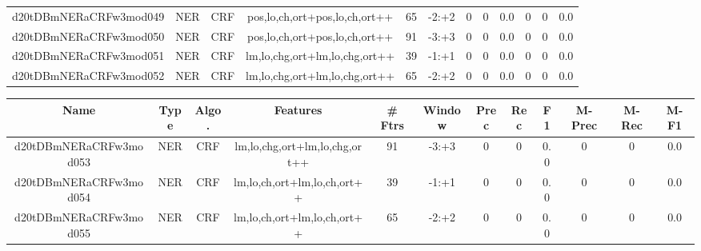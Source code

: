 \documentclass[a4paper]{article}
\begin{document}
\begin{landscape}
\begin{center}
\begin{tabular}{ |c|c|c|c|c|c|c|c|c|c|c|c|}
 	\small{ d20tDBmNERaCRFw3mod049 } & \small{ NER} & \small{  CRF }  & pos,lo,ch,ort+pos,lo,ch,ort++  &  65 &  \small{  -2:+2 }  &  0 & 0 & 0.0  &  0 & 0 & 0.0 \\
 	

 
 	
 	\small{ d20tDBmNERaCRFw3mod050 } & \small{ NER} & \small{  CRF }  & pos,lo,ch,ort+pos,lo,ch,ort++  &  91 &  \small{  -3:+3 }  &  0 & 0 & 0.0  &  0 & 0 & 0.0 \\
 	

 
 	
 	\small{ d20tDBmNERaCRFw3mod051 } & \small{ NER} & \small{  CRF }  & lm,lo,chg,ort+lm,lo,chg,ort++  &  39 &  \small{  -1:+1 }  &  0 & 0 & 0.0  &  0 & 0 & 0.0 \\
 	

 
 	
 	\small{ d20tDBmNERaCRFw3mod052 } & \small{ NER} & \small{  CRF }  & lm,lo,chg,ort+lm,lo,chg,ort++  &  65 &  \small{  -2:+2 }  &  0 & 0 & 0.0  &  0 & 0 & 0.0 \\
 	
 \hline
\end{tabular}
\end{center}




\begin{center}
\begin{tabular}{ |c|c|c|c|c|c|c|c|c|c|c|c|} 
 \hline
 	Name & Type & Algo. & Features & \# Ftrs & Window & Prec & Rec & F1 & M-Prec & M-Rec & M-F1\\
 \hline

 	

 
 	
 	\small{ d20tDBmNERaCRFw3mod053 } & \small{ NER} & \small{  CRF }  & lm,lo,chg,ort+lm,lo,chg,ort++  &  91 &  \small{  -3:+3 }  &  0 & 0 & 0.0  &  0 & 0 & 0.0 \\
 	

 
 	
 	\small{ d20tDBmNERaCRFw3mod054 } & \small{ NER} & \small{  CRF }  & lm,lo,ch,ort+lm,lo,ch,ort++  &  39 &  \small{  -1:+1 }  &  0 & 0 & 0.0  &  0 & 0 & 0.0 \\
 	

 
 	
 	\small{ d20tDBmNERaCRFw3mod055 } & \small{ NER} & \small{  CRF }  & lm,lo,ch,ort+lm,lo,ch,ort++  &  65 &  \small{  -2:+2 }  &  0 & 0 & 0.0  &  0 & 0 & 0.0 \\
 	


\end{tabular}
\end{center}
\end{landscape}
\end{document}
